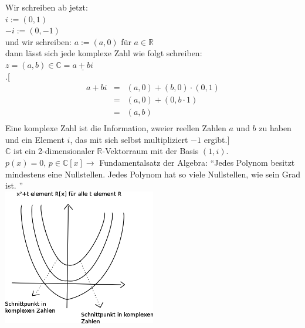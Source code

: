 Wir schreiben ab jetzt:\\
$i:=(0,1)$\\
$-i:=(0,-1)$\\
und wir schreiben: $a:=(a,0)$ für $a\in\mathbb{R}$\\
dann lässt sich jede komplexe Zahl wie folgt schreiben:\\
$z=(a,b)\in\mathbb{C}=\underline{a+bi}$\\
.[ 
\begin{eqnarray*}
a+bi &=& (a,0)+(b,0)\cdot(0,1)\\
&=& (a,0)+(0,b\cdot1)\\
&=& (a,b)\\
\end{eqnarray*}
Eine komplexe Zahl ist die Information, zweier reellen Zahlen $a$ und $b$ zu haben und ein Element $i$, das mit sich selbst multipliziert $-1$ ergibt.\quad ]\\
$\mathbb{C}$ ist ein 2-dimensionaler $\mathbb{R}$-Vektorraum mit der Basis $(1,i)$.\\
$p(x)=0, \, p\in \mathbb{C}[x] \rightarrow$ Fundamentalsatz der Algebra: "`Jedes Polynom besitzt mindestens eine Nullstellen. Jedes Polynom hat so viele Nullstellen, wie sein Grad ist. "'\\
\includegraphics[width=0.5\textwidth]{mainmatter/chapter3/pics/komplexkoord.png}
%
%
%
